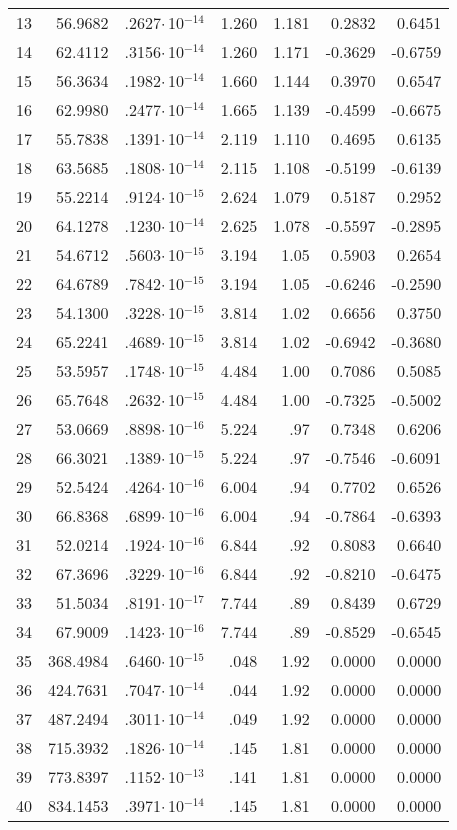 \begin{longtable}{lrrrrrr}
13 & 56.9682 & .2627$\cdot$\,10$^{-14}$ & 1.260 & 1.181 & 0.2832 & 0.6451 \\
14 & 62.4112 & .3156$\cdot$\,10$^{-14}$ & 1.260 & 1.171 & -0.3629 & -0.6759 \\
15 & 56.3634 & .1982$\cdot$\,10$^{-14}$ & 1.660 & 1.144 & 0.3970 &  0.6547 \\
16 & 62.9980 & .2477$\cdot$\,10$^{-14}$ & 1.665 & 1.139 & -0.4599 & -0.6675 \\
17 & 55.7838 & .1391$\cdot$\,10$^{-14}$ & 2.119 & 1.110 & 0.4695 & 0.6135 \\
18 & 63.5685 & .1808$\cdot$\,10$^{-14}$ & 2.115 & 1.108 & -0.5199 & -0.6139 \\
19 & 55.2214 & .9124$\cdot$\,10$^{-15}$ & 2.624 & 1.079 & 0.5187 & 0.2952 \\
20 & 64.1278 & .1230$\cdot$\,10$^{-14}$ & 2.625 & 1.078 & -0.5597 & -0.2895 \\
21 & 54.6712 & .5603$\cdot$\,10$^{-15}$ & 3.194 & 1.05 & 0.5903 & 0.2654 \\
22 & 64.6789 & .7842$\cdot$\,10$^{-15}$ & 3.194 & 1.05 & -0.6246 & -0.2590 \\
23 & 54.1300 & .3228$\cdot$\,10$^{-15}$ & 3.814 & 1.02 & 0.6656 & 0.3750 \\
24 & 65.2241 & .4689$\cdot$\,10$^{-15}$ & 3.814 & 1.02 & -0.6942 & -0.3680 \\
25 & 53.5957 & .1748$\cdot$\,10$^{-15}$ & 4.484 & 1.00 & 0.7086 & 0.5085 \\
26 & 65.7648 & .2632$\cdot$\,10$^{-15}$ & 4.484 & 1.00 & -0.7325 & -0.5002 \\
27 & 53.0669 & .8898$\cdot$\,10$^{-16}$ & 5.224 & .97 & 0.7348 & 0.6206 \\
28 & 66.3021 & .1389$\cdot$\,10$^{-15}$ & 5.224 & .97 & -0.7546 & -0.6091 \\
29 & 52.5424 & .4264$\cdot$\,10$^{-16}$ & 6.004 & .94 & 0.7702 & 0.6526 \\
30 & 66.8368 & .6899$\cdot$\,10$^{-16}$ & 6.004 & .94 & -0.7864 & -0.6393 \\
31 & 52.0214 & .1924$\cdot$\,10$^{-16}$ & 6.844 & .92 & 0.8083 & 0.6640 \\
32 & 67.3696 & .3229$\cdot$\,10$^{-16}$ & 6.844 & .92 & -0.8210 & -0.6475 \\
33 & 51.5034 & .8191$\cdot$\,10$^{-17}$ & 7.744 & .89 & 0.8439 & 0.6729 \\
34 & 67.9009 & .1423$\cdot$\,10$^{-16}$ & 7.744 & .89 & -0.8529 & -0.6545 \\
35 & 368.4984 & .6460$\cdot$\,10$^{-15}$ & .048 & 1.92 & 0.0000 & 0.0000 \\
36 & 424.7631 & .7047$\cdot$\,10$^{-14}$ & .044 & 1.92 & 0.0000 & 0.0000 \\
37 & 487.2494 & .3011$\cdot$\,10$^{-14}$ & .049 & 1.92 & 0.0000 & 0.0000 \\
38 & 715.3932 & .1826$\cdot$\,10$^{-14}$ & .145 & 1.81 & 0.0000 & 0.0000 \\
39 & 773.8397 & .1152$\cdot$\,10$^{-13}$ & .141 & 1.81 & 0.0000 & 0.0000 \\
40 & 834.1453 &  .3971$\cdot$\,10$^{-14}$ & .145 & 1.81 & 0.0000 & 0.0000 \\
\end{longtable}
